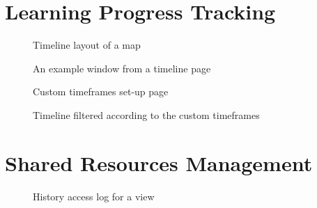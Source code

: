 \section{Learning Progress Tracking}

\begin{figure}[ht!]
\centering
\setlength\fboxsep{0pt}
\setlength\fboxrule{0.5pt}
\caption{Timeline layout of a map}
\end{figure}

\begin{figure}[ht!]
\centering
\setlength\fboxsep{0pt}
\setlength\fboxrule{0.5pt}
\caption{An example window from a timeline page}
\end{figure}

\begin{figure}[ht!]
\centering
\setlength\fboxsep{0pt}
\setlength\fboxrule{0.5pt}
\caption{Custom timeframes set-up page}
\end{figure}

\begin{figure}[htb]
\centering
\setlength\fboxsep{0pt}
\setlength\fboxrule{0.5pt}
\caption{Timeline filtered according to the custom timeframes}
\end{figure}

\FloatBarrier

\section{Shared Resources Management}

\begin{figure}[ht!]
\centering
\setlength\fboxsep{0pt}
\setlength\fboxrule{0.5pt}
\caption{History access log for a view}
\end{figure}